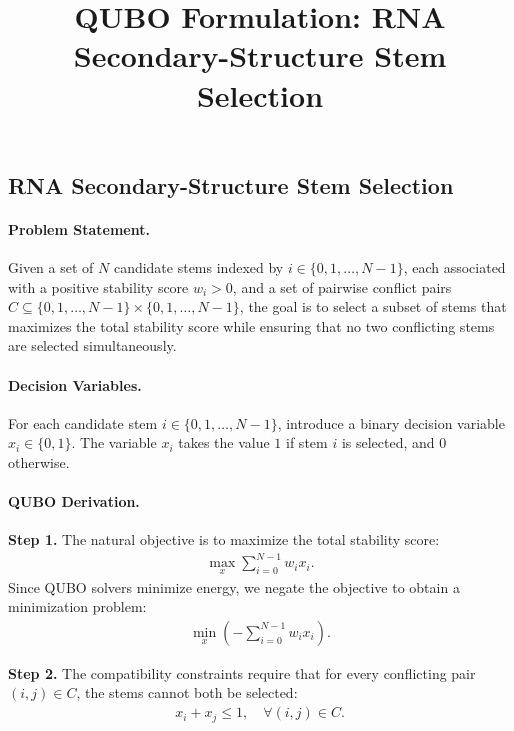 \documentclass[12pt]{article}
\title{QUBO Formulation: RNA Secondary-Structure Stem Selection}
\date{}
\begin{document}
\maketitle

\subsection*{RNA Secondary-Structure Stem Selection}

\paragraph{Problem Statement.}
Given a set of $N$ candidate stems indexed by $i \in \{0, 1, \dots, N-1\}$, each associated with a positive stability score $w_i > 0$, and a set of pairwise conflict pairs $C \subseteq \{0, 1, \dots, N-1\} \times \{0, 1, \dots, N-1\}$, the goal is to select a subset of stems that maximizes the total stability score while ensuring that no two conflicting stems are selected simultaneously.

\paragraph{Decision Variables.}
For each candidate stem $i \in \{0, 1, \dots, N-1\}$, introduce a binary decision variable $x_i \in \{0, 1\}$. The variable $x_i$ takes the value $1$ if stem $i$ is selected, and $0$ otherwise.

\paragraph{QUBO Derivation.}
\textbf{Step 1.} The natural objective is to maximize the total stability score:
\begin{align}
    \max_{x} \sum_{i=0}^{N-1} w_i x_i.
\end{align}
Since QUBO solvers minimize energy, we negate the objective to obtain a minimization problem:
\begin{align}
    \min_{x} \left( -\sum_{i=0}^{N-1} w_i x_i \right).
\end{align}

\textbf{Step 2.} The compatibility constraints require that for every conflicting pair $(i,j) \in C$, the stems cannot both be selected:
\begin{align}
    x_i + x_j \le 1, \quad \forall (i,j) \in C.
\end{align}
\end{document}
